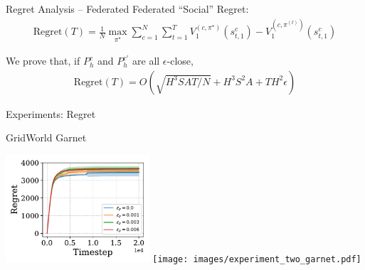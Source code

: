 \documentclass[aspectratio=169,12pt]{beamer}
\begin{document}
\begin{frame}{Regret Analysis -- Federated}
  Federated ``Social'' Regret:
  \begin{align*}
    \text{Regret}(T)
    = \frac{1}{N}
    \max_{\pi^\star} 
    \sum_{c=1}^N \sum_{t=1}^T 
    V_1^{(c,\pi^\star)}(s_{t,1}^{c}) - V_1^{(c, \pi^{(t)})}(s_{t,1}^{c})
  \end{align*}

  We prove that, if $P_h^c$ and $P_h^{c'}$ are all $\epsilon$-close,
  \begin{align}
    \nonumber
    \text{Regret}(T) = O \left( \sqrt{H^3 S A T / N } + H^3 S^2 A + TH^2 \epsilon \right)
  \end{align}  
\end{frame}


\begin{frame}{Experiments: Regret}

  \qquad \qquad \qquad \qquad GridWorld \qquad \qquad \qquad \qquad \qquad Garnet

  \vspace{-1.5em}
  
  \begin{center}
    \includegraphics[width=0.4\textwidth]{images/experiment_two_gridworld.pdf}%
    \texttt{[image: images/experiment\_two\_garnet.pdf]}  
  \end{center}

\end{frame}
\end{document}
